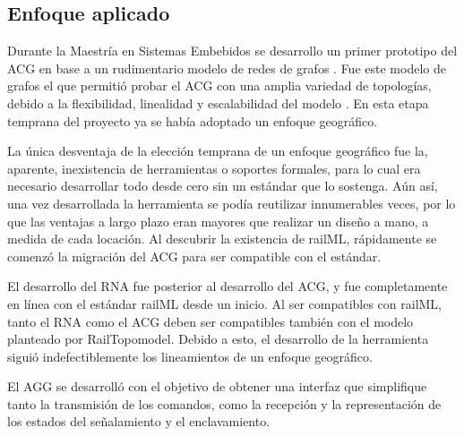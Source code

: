\subsection{Enfoque aplicado}

    Durante la Maestría en Sistemas Embebidos se desarrollo un primer prototipo del ACG en base a un rudimentario modelo de redes de grafos \cite{Paper_206}. Fue este modelo de grafos el que permitió probar el ACG con una amplia variedad de topologías, debido a la flexibilidad, linealidad y escalabilidad del modelo \cite{Paper_109,Paper_149,Paper_150}. En esta etapa temprana del proyecto ya se había adoptado un enfoque geográfico.

    La única desventaja de la elección temprana de un enfoque geográfico fue la, aparente, inexistencia de herramientas o soportes formales, para lo cual era necesario desarrollar todo desde cero sin un estándar que lo sostenga. Aún así, una vez desarrollada la herramienta se podía reutilizar innumerables veces, por lo que las ventajas a largo plazo eran mayores que realizar un diseño a mano, a medida de cada locación. Al descubrir la existencia de railML, rápidamente se comenzó la migración del ACG para ser compatible con el estándar.

    El desarrollo del RNA fue posterior al desarrollo del ACG, y fue completamente en línea con el estándar railML desde un inicio. Al ser compatibles con railML, tanto el RNA como el ACG deben ser compatibles también con el modelo planteado por RailTopomodel. Debido a esto, el desarrollo de la herramienta siguió indefectiblemente los lineamientos de un enfoque geográfico.
    
    
    El AGG se desarrolló con el objetivo de obtener una interfaz que simplifique tanto la transmisión de los comandos, como la recepción y la representación de los estados del señalamiento y el enclavamiento.